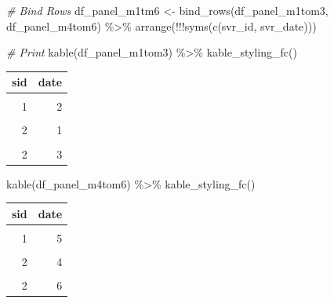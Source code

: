 \documentclass[
]{book}
\newenvironment{Shaded}{\begin{snugshade}}{\end{snugshade}}
\newcommand{\CommentTok}[1]{\textcolor[rgb]{0.56,0.35,0.01}{\textit{#1}}}
\newcommand{\FunctionTok}[1]{\textcolor[rgb]{0.00,0.00,0.00}{#1}}
\newcommand{\NormalTok}[1]{#1}
\newcommand{\OtherTok}[1]{\textcolor[rgb]{0.56,0.35,0.01}{#1}}
\newcommand{\SpecialCharTok}[1]{\textcolor[rgb]{0.00,0.00,0.00}{#1}}
\begin{document}
\begin{Shaded}
\begin{Highlighting}[]
\CommentTok{\# Bind Rows}
\NormalTok{df\_panel\_m1tm6 }\OtherTok{\textless{}{-}} \FunctionTok{bind\_rows}\NormalTok{(df\_panel\_m1tom3, df\_panel\_m4tom6) }\SpecialCharTok{\%\textgreater{}\%} \FunctionTok{arrange}\NormalTok{(}\SpecialCharTok{!!!}\FunctionTok{syms}\NormalTok{(}\FunctionTok{c}\NormalTok{(svr\_id, svr\_date)))}

\CommentTok{\# Print}
\FunctionTok{kable}\NormalTok{(df\_panel\_m1tom3) }\SpecialCharTok{\%\textgreater{}\%}
  \FunctionTok{kable\_styling\_fc}\NormalTok{()}
\end{Highlighting}
\end{Shaded}

\begin{table}[!h]
\centering
\begin{tabular}{r|r}
\hline
sid & date\\
\hline
\cellcolor{gray!6}{1} & \cellcolor{gray!6}{1}\\
\hline
1 & 2\\
\hline
\cellcolor{gray!6}{1} & \cellcolor{gray!6}{3}\\
\hline
2 & 1\\
\hline
\cellcolor{gray!6}{2} & \cellcolor{gray!6}{2}\\
\hline
2 & 3\\
\hline
\end{tabular}
\end{table}

\begin{Shaded}
\begin{Highlighting}[]
\FunctionTok{kable}\NormalTok{(df\_panel\_m4tom6) }\SpecialCharTok{\%\textgreater{}\%}
  \FunctionTok{kable\_styling\_fc}\NormalTok{()}
\end{Highlighting}
\end{Shaded}

\begin{table}[!h]
\centering
\begin{tabular}{r|r}
\hline
sid & date\\
\hline
\cellcolor{gray!6}{1} & \cellcolor{gray!6}{4}\\
\hline
1 & 5\\
\hline
\cellcolor{gray!6}{1} & \cellcolor{gray!6}{6}\\
\hline
2 & 4\\
\hline
\cellcolor{gray!6}{2} & \cellcolor{gray!6}{5}\\
\hline
2 & 6\\
\hline
\end{tabular}
\end{table}
\end{document}
